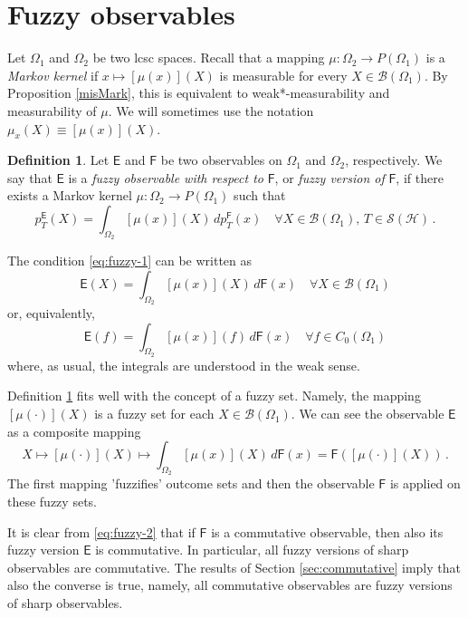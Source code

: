 \documentclass[12pt]{amsart}
\theoremstyle{definition}
\newtheorem{definition}{Definition}
\newcommand{\sh}{\mathcal{S(H)}} %
\newcommand{\Eo}{\mathsf{E}} %
\newcommand{\Fo}{\mathsf{F}} %
\newcommand{\bor}[1]{\mathcal{B}(#1)} %
\newcommand{\de}{\, d}
\newcommand{\frecc}{\rightarrow}
\begin{document}
\section{Fuzzy observables}\label{sec:fuzzy}


Let $\Omega_1$ and $\Omega_2$ be two lcsc spaces. Recall that a mapping $\mu:\Omega_2\to P(\Omega_1)$ is a \emph{Markov kernel} if $x\mapsto [\mu(x)](X)$ is measurable for every $X\in\bor{\Omega_1}$. By Proposition \ref{misMark}, this is equivalent to weak*-measurability and measurability of $\mu$. We will sometimes use the notation $\mu_{x}(X)\equiv [\mu(x)](X)$.

\begin{definition}\label{def:fuzzy}
Let $\Eo$ and $\Fo$ be two observables on $\Omega_1$ and $\Omega_2$, respectively. We say that $\Eo$ is a \emph{fuzzy observable with respect to} $\Fo$, or {\em fuzzy version of} $\Fo$, if there exists a Markov kernel $\mu : \Omega_2 \frecc P(\Omega_1)$ such that
\begin{equation}\label{eq:fuzzy-1}
p^{\Eo}_T (X)  = \int_{\Omega_2} [\mu (x)] (X) \de p^{\Fo}_T (x) \quad \forall X\in\bor{\Omega_1},\, T\in\sh \, .
\end{equation}
\end{definition}

The condition \eqref{eq:fuzzy-1} can be written as
\begin{equation}\label{eq:fuzzy-2}
\Eo(X)  = \int_{\Omega_2} [\mu (x)] (X) \de\Fo(x) \quad \forall X\in\bor{\Omega_1}
\end{equation}
or, equivalently,
\begin{equation*}
\Eo(f)  = \int_{\Omega_2} [\mu (x)] (f) \de\Fo(x) \quad \forall f\in C_0 (\Omega_1)
\end{equation*}
where, as usual, the integrals are understood in the weak sense.

Definition \ref{def:fuzzy} fits well with the concept of a fuzzy set. Namely, the mapping $[\mu (\cdot)] (X)$ is a fuzzy set for each $X\in\bor{\Omega_1}$. We can see the observable $\Eo$ as a composite mapping
\begin{equation*}
X \mapsto [\mu (\cdot)] (X) \mapsto \int_{\Omega_2} [\mu (x)] (X) \de\Fo(x) = \Fo ([\mu (\cdot)] (X)) \, .
\end{equation*}
The first mapping 'fuzzifies' outcome sets and then the observable $\Fo$ is applied on these fuzzy sets.

It is clear from \eqref{eq:fuzzy-2} that if $\Fo$ is a commutative observable, then also its fuzzy version $\Eo$ is commutative. In particular, all fuzzy versions of sharp observables are commutative. The results of Section \ref{sec:commutative} imply that also the converse is true, namely, all commutative observables are fuzzy versions of sharp observables.
\end{document}
